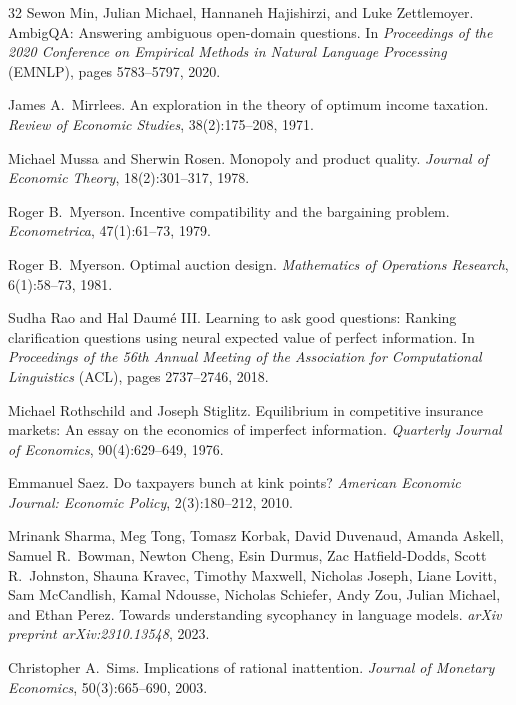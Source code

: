 \documentclass[11pt]{article}
\begin{document}
\begin{thebibliography}{32}
Sewon Min, Julian Michael, Hannaneh Hajishirzi, and Luke Zettlemoyer.
AmbigQA: Answering ambiguous open-domain questions.
In \textit{Proceedings of the 2020 Conference on Empirical Methods in Natural Language Processing} (EMNLP),
pages 5783--5797, 2020.

James A.\ Mirrlees.
An exploration in the theory of optimum income taxation.
\textit{Review of Economic Studies}, 38(2):175--208, 1971.

Michael Mussa and Sherwin Rosen. Monopoly and product quality. \textit{Journal
of Economic Theory}, 18(2):301--317, 1978.

Roger B.\ Myerson.
Incentive compatibility and the bargaining problem.
\textit{Econometrica}, 47(1):61--73, 1979.

Roger B.\ Myerson. Optimal auction design. \textit{Mathematics of Operations
Research}, 6(1):58--73, 1981.

Sudha Rao and Hal Daum{\'e} III.
Learning to ask good questions: Ranking clarification questions using neural expected value of perfect information.
In \textit{Proceedings of the 56th Annual Meeting of the Association for Computational Linguistics} (ACL),
pages 2737--2746, 2018.

Michael Rothschild and Joseph Stiglitz.
Equilibrium in competitive insurance markets: An essay on the economics of imperfect information.
\textit{Quarterly Journal of Economics}, 90(4):629--649, 1976.

Emmanuel Saez. Do taxpayers bunch at kink points?
\textit{American Economic Journal: Economic Policy}, 2(3):180--212, 2010.

Mrinank Sharma, Meg Tong, Tomasz Korbak, David Duvenaud, Amanda Askell, Samuel R.\ Bowman, Newton Cheng, Esin Durmus, Zac Hatfield-Dodds, Scott R.\ Johnston, Shauna Kravec, Timothy Maxwell, Nicholas Joseph, Liane Lovitt, Sam McCandlish, Kamal Ndousse, Nicholas Schiefer, Andy Zou, Julian Michael, and Ethan Perez.
Towards understanding sycophancy in language models.
\textit{arXiv preprint arXiv:2310.13548}, 2023.

Christopher A.\ Sims. Implications of rational inattention. \textit{Journal of
Monetary Economics}, 50(3):665--690, 2003.


\end{thebibliography}
\end{document}
